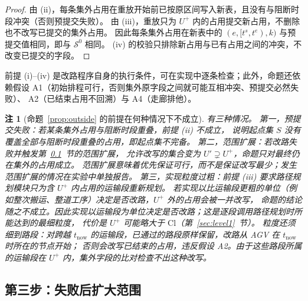 \documentclass[manuscript,screen,review]{acmart}
\newtheorem{remark}{注}
\begin{document}
\begin{proof}
由 (ii)，每条集外占用在重放开始前已按原区间写入新表，且没有与阻断时段冲突（否则预提交失败）。
由 (iii)，重放只为 \(U^{+}\) 内的占用提交新占用，不删除也不改写已提交的集外占用。
因此每条集外占用在新表中的 \((e,[t^s,t^e),k)\) 与预提交值相同，即与 \(\mathcal{S}^0\) 相同。
(iv) 的校验只排除新占用与已有占用之间的冲突，不改变已提交的字段。
\end{proof}

前提 (i)--(iv) 是改路程序自身的执行条件，可在实现中逐条检查；此外，命题还依赖假设
A1（初始排程可行，否则集外原字段之间就可能互相冲突、预提交必然失败）、
A2（已结束占用不回溯）与 A4（走廊排他）。

\begin{remark}[命题~\ref{prop:outside} 的前提在何种情况下不成立]
\label{rem:precommit}
有三种情况。
第一，预提交失败：若某条集外占用与阻断时段重叠，前提 (ii) 不成立，
说明起点集 \(S\) 没有覆盖全部与阻断时段重叠的占用，即起点集不完备。
第二，范围扩展：若改路失败并触发第~\ref{sec:scope_escalation}~节的范围扩展，
允许改写的集合变为 \(U'\supsetneq U^{+}\)，命题只对最终仍在集外的占用成立。
范围扩展意味着优先保证可行，而不是保证改写最少；发生范围扩展的情况在实验中单独报告。
第三，实现粒度过粗：前提 (iii) 要求路径规划模块\emph{只}为含 \(U^{+}\) 内占用的运输段重新规划。
若实现以比运输段更粗的单位（例如整次搬运、整道工序）决定是否改路，\(U^{+}\) 外的占用会被一并改写，
命题的结论随之不成立。因此实现以运输段为单位决定是否改路；这是逐段调用路径规划时所能达到的最细粒度，
代价是 \(U^{+}\) 可能略大于 \(\mathrm{Cl}\)（第~\ref{sec:level1}~节）。
粒度还须细到路段：对跨越 \(t_{\mathrm{now}}\) 的运输段，已通过的路段原样保留，改路从 AGV 在 \(t_{\mathrm{now}}\) 时所在的节点开始；
否则会改写已结束的占用，违反假设 A2。由于这些路段所属的运输段在 \(U^{+}\) 内，集外字段的比对检查不出这种改写。
\end{remark}

\subsection{第三步：失败后扩大范围}
\label{sec:scope_escalation}
\end{document}
